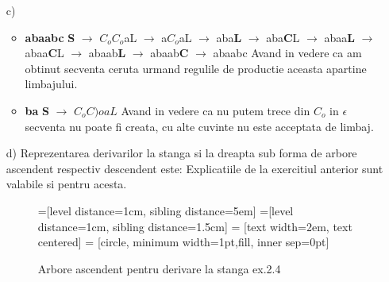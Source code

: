 \begin{enumerate}
\begin{enumerate}
\item[c)]
\begin{itemize}
\item \textbf{abaabc}\newline
\textbf{S} $\rightarrow$ \textbf{$C_{o}$}$C_{o}$aL $\rightarrow$ a\textbf{$C_{o}$}aL $\rightarrow$ aba\textbf{L} $\rightarrow$ aba\textbf{C}L $\rightarrow$ abaa\textbf{L} $\rightarrow$ abaa\textbf{C}L $\rightarrow$ abaab\textbf{L} $\rightarrow$ abaab\textbf{C} $\rightarrow$ abaabc \newline
Avand in vedere ca am obtinut secventa ceruta urmand regulile de productie aceasta apartine limbajului.
\item \textbf{ba}\newline
\textbf{S} $\rightarrow$ $C_{o}C){o}aL$ \newline
Avand in vedere ca nu putem trece din $C_{o}$ in $\epsilon$ secventa nu poate fi creata, cu alte cuvinte nu este acceptata de limbaj.
\end{itemize}

\item[d)]
Reprezentarea derivarilor la stanga si la dreapta sub forma de arbore ascendent respectiv descendent este:\newline
Explicatiile de la exercitiul anterior sunt valabile si pentru acesta.

\begin{figure}[H]
=[level distance=1cm, sibling distance=5em]
=[level distance=1cm, sibling distance=1.5cm]
 = [text width=2em, text centered]
 = [circle, minimum width=1pt,fill, inner sep=0pt]
\caption{Arbore ascendent pentru derivare la stanga ex.2.4}
\end{figure}


\end{enumerate}
\end{enumerate}

